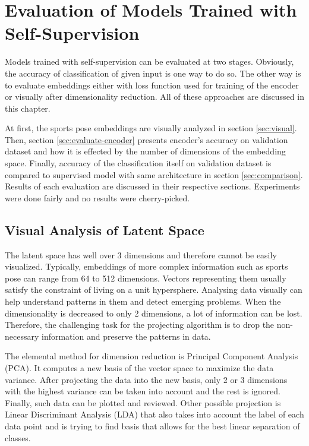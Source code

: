 \chapter{\label{chap:evaluation}Evaluation of Models Trained with Self-Supervision}

Models trained with self-supervision can be evaluated at two stages. Obviously, the accuracy of classification of given input is one way to do so. The other way is to evaluate embeddings either with loss function used for training of the encoder or visually after dimensionality reduction. All of these approaches are discussed in this chapter.

At first, the sports pose embeddings are visually analyzed in section \ref{sec:visual}. Then, section \ref{sec:evaluate-encoder} presents encoder's accuracy on validation dataset and how it is effected by the number of dimensions of the embedding space. Finally, accuracy of the classification itself on validation dataset is compared to supervised model with same architecture in section \ref{sec:comparison}. Results of each evaluation are discussed in their respective sections. Experiments were done fairly and no results were cherry-picked.

\section{\label{sec:visual}Visual Analysis of Latent Space}

The latent space has well over 3 dimensions and therefore cannot be easily visualized. Typically, embeddings of more complex information such as sports pose can range from 64 to 512 dimensions. Vectors representing them usually satisfy the constraint of living on a unit hypersphere. Analysing data visually can help understand patterns in them and detect emerging problems. When the dimensionality is decreased to only 2 dimensions, a lot of information can be lost. Therefore, the challenging task for the projecting algorithm is to drop the non-necessary information and preserve the patterns in data.

The elemental method for dimension reduction is Principal Component Analysis (PCA). It computes a new basis of the vector space to maximize the data variance. After projecting the data into the new basis, only 2 or 3 dimensions with the highest variance can be taken into account and the rest is ignored. Finally, such data can be plotted and reviewed. Other possible projection is Linear Discriminant Analysis (LDA) that also takes into account the label of each data point and is trying to find basis that allows for the best linear separation of classes.

